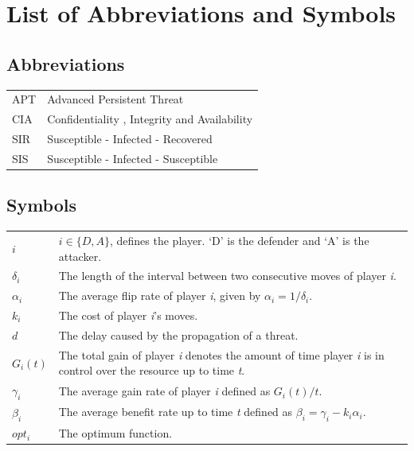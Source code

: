 \documentclass[master=cws, masteroption=vs]{kulemt}
\begin{document}
\chapter{List of Abbreviations and Symbols}
\section*{Abbreviations}
\begin{flushleft}
  \renewcommand{\arraystretch}{1.1}
  \begin{tabularx}{\textwidth}{@{}p{12mm}X@{}}
    APT & Advanced Persistent Threat \\
    CIA & Confidentiality , Integrity and Availability \\
    SIR & Susceptible - Infected - Recovered \\
    SIS & Susceptible - Infected - Susceptible \\
  \end{tabularx}
\end{flushleft}
\section*{Symbols}
\begin{flushleft}
  \renewcommand{\arraystretch}{1.1}
  \begin{tabularx}{\textwidth}{@{}p{12mm}X@{}}
 $i$ & $i \in \{D,A\}$, defines the player. `D' is the defender and `A' is the attacker. \\
 $\delta_{i}$ & The length of the interval between two consecutive moves of player \textit{i}. \\
 $\alpha_{i}$ & The average flip rate of player \textit{i}, given by $\alpha_{i}=1/\delta_{i}$. \\
$k_{i}$ & The cost of player \textit{i}'s moves. \\
$d$ & The delay caused by the propagation of a threat. \\
 $G_{i}(t)$ & The total gain of player \textit{i} denotes the amount of time player \textit{i} is in control over the resource up to time \textit{t}. \\
$\gamma_{i}$ & The average gain rate of player \textit{i} defined as $G_{i}(t)/t$. \\
$\beta_{i}$ &  The average benefit rate up to time \textit{t} defined as  $\beta_{i} = \gamma_{i} -k_{i} \alpha_{i} $. \\
$opt_{i}$ & The optimum function. \\
  \end{tabularx}
\end{flushleft}
\end{document}
